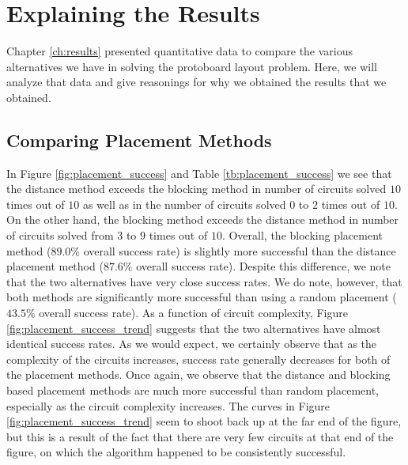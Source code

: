 \section{Explaining the Results}

Chapter \ref{ch:results} presented quantitative data to compare the various
alternatives we have in solving the protoboard layout problem. Here, we will
analyze that data and give reasonings for why we obtained the results
that we obtained.

\subsection{Comparing Placement Methods}

In Figure \ref{fig:placement_success} and Table \ref{tb:placement_success} we
see that the distance method exceeds the blocking method in number of circuits
solved $10$ times out of $10$ as well as in the number of circuits solved $0$
to $2$ times out of $10$. On the other hand, the blocking method exceeds the
distance method in number of circuits solved from $3$ to $9$ times out
of $10$. Overall, the blocking placement method ($89.0\%$ overall success rate)
is slightly more successful than the distance placement method ($87.6\%$ overall
success rate). Despite this difference, we note that the
two alternatives have very
close success rates. We do note, however, that both methods are significantly
more successful than using a random placement ($43.5\%$ overall success rate).
As a function of circuit
complexity, Figure
\ref{fig:placement_success_trend} suggests that the two alternatives have almost
identical success rates. As we would expect, we certainly observe that as the
complexity of the circuits
increases, success rate generally decreases for both of the placement methods.
Once again, we observe that the distance and blocking based placement methods
are much more successful than random placement, especially as the circuit
complexity increases.
The curves in Figure \ref{fig:placement_success_trend} seem to shoot back up
at the far end of the figure, but this is a result of the fact that there are
very few circuits at that end of the figure, on which the algorithm happened to
be consistently successful.

